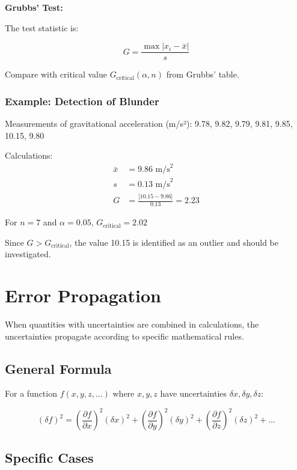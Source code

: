 \documentclass[twoside]{book}
\begin{document}
\textbf{Grubbs' Test:}

The test statistic is:

\begin{equation*}
G = \frac{\max|x_i - \bar{x}|}{s}
\end{equation*}

Compare with critical value $G_{\text{critical}}(\alpha, n)$ from Grubbs' table.

\subsubsection{Example: Detection of Blunder}

Measurements of gravitational acceleration (m/s²):
9.78, 9.82, 9.79, 9.81, 9.85, 10.15, 9.80

Calculations:
\begin{align*}
\bar{x} &= 9.86 \text{ m/s}^2 \\
s &= 0.13 \text{ m/s}^2 \\
G &= \frac{|10.15 - 9.86|}{0.13} = 2.23
\end{align*}

For $n = 7$ and $\alpha = 0.05$, $G_{\text{critical}} = 2.02$

Since $G > G_{\text{critical}}$, the value 10.15 is identified as an outlier and should be investigated.

\section{Error Propagation}

When quantities with uncertainties are combined in calculations, the uncertainties propagate according to specific mathematical rules.

\subsection{General Formula}

For a function $f(x, y, z, \ldots)$ where $x, y, z$ have uncertainties $\delta x, \delta y, \delta z$:

\begin{equation*}
(\delta f)^2 = \left(\frac{\partial f}{\partial x}\right)^2(\delta x)^2 + \left(\frac{\partial f}{\partial y}\right)^2(\delta y)^2 + \left(\frac{\partial f}{\partial z}\right)^2(\delta z)^2 + \ldots
\end{equation*}

\subsection{Specific Cases}
\end{document}

